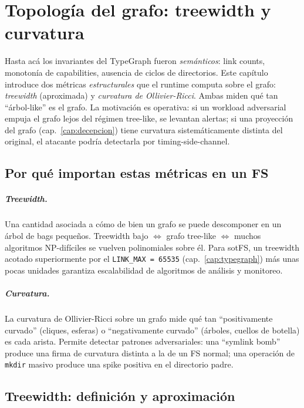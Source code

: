 \chapter{Topología del grafo: treewidth y curvatura}
\label{cap:topologia}

Hasta acá los invariantes del TypeGraph fueron \emph{semánticos}: link
counts, monotonía de capabilities, ausencia de ciclos de directorios.
Este capítulo introduce dos métricas \emph{estructurales} que el
runtime computa sobre el grafo: \emph{treewidth} (aproximada) y
\emph{curvatura de Ollivier-Ricci}. Ambas miden qué tan ``árbol-like''
es el grafo. La motivación es operativa: si un workload adversarial
empuja el grafo lejos del régimen tree-like, se levantan alertas; si
una proyección del grafo (cap.~\ref{cap:decepcion}) tiene curvatura
sistemáticamente distinta del original, el atacante podría detectarla
por timing-side-channel.

\section{Por qué importan estas métricas en un FS}

\paragraph{Treewidth.} Una cantidad asociada a cómo de bien un grafo se
puede descomponer en un árbol de bags pequeños. Treewidth bajo
$\Leftrightarrow$ grafo tree-like $\Leftrightarrow$ muchos algoritmos
NP-difíciles se vuelven polinomiales sobre él. Para sotFS, un
treewidth acotado superiormente por el \texttt{LINK\_MAX = 65535}
(cap.~\ref{cap:typegraph}) más unas pocas unidades garantiza
escalabilidad de algoritmos de análisis y monitoreo.

\paragraph{Curvatura.} La curvatura de Ollivier-Ricci sobre un grafo
mide qué tan ``positivamente curvado'' (cliques, esferas) o
``negativamente curvado'' (árboles, cuellos de botella) es cada arista.
Permite detectar patrones adversariales: una ``symlink bomb''
produce una firma de curvatura distinta a la de un FS normal; una
operación de \texttt{mkdir} masivo produce una spike positiva en el
directorio padre.

\section{Treewidth: definición y aproximación}

